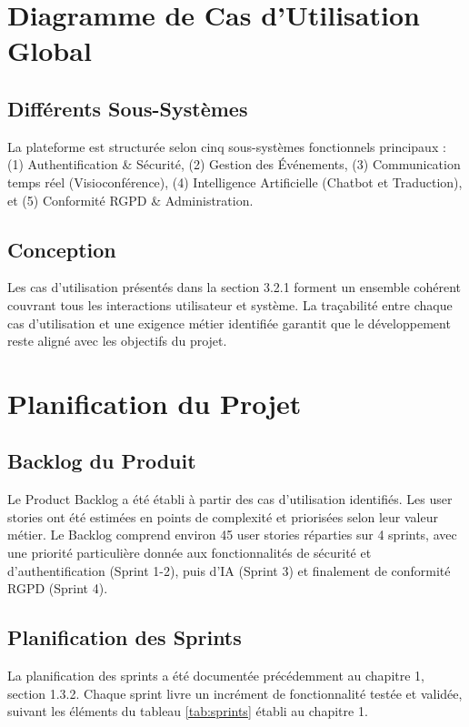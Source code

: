 \section{Diagramme de Cas d'Utilisation Global}

\subsection{Différents Sous-Systèmes}
La plateforme est structurée selon cinq sous-systèmes fonctionnels principaux : (1) Authentification \& Sécurité, (2) Gestion des Événements, (3) Communication temps réel (Visioconférence), (4) Intelligence Artificielle (Chatbot et Traduction), et (5) Conformité RGPD \& Administration.

\subsection{Conception}
Les cas d'utilisation présentés dans la section 3.2.1 forment un ensemble cohérent couvrant tous les interactions utilisateur et système. La traçabilité entre chaque cas d'utilisation et une exigence métier identifiée garantit que le développement reste aligné avec les objectifs du projet.

\section{Planification du Projet}

\subsection{Backlog du Produit}
Le Product Backlog a été établi à partir des cas d'utilisation identifiés. Les user stories ont été estimées en points de complexité et priorisées selon leur valeur métier. Le Backlog comprend environ 45 user stories réparties sur 4 sprints, avec une priorité particulière donnée aux fonctionnalités de sécurité et d'authentification (Sprint 1-2), puis d'IA (Sprint 3) et finalement de conformité RGPD (Sprint 4).

\subsection{Planification des Sprints}
La planification des sprints a été documentée précédemment au chapitre 1, section 1.3.2. Chaque sprint livre un incrément de fonctionnalité testée et validée, suivant les éléments du tableau \ref{tab:sprints} établi au chapitre 1.

